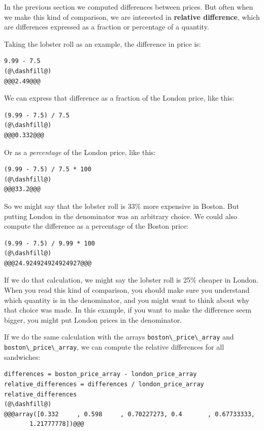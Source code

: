 In the previous section we computed differences between prices. But
often when we make this kind of comparison, we are interested in
\textbf{relative difference}, which are differences expressed as a
fraction or percentage of a quantity.

Taking the lobster roll as an example, the difference in price is:

\begin{lstlisting}[]
9.99 - 7.5
(@\dashfill@)
@@@2.49@@@
\end{lstlisting}

We can express that difference as a fraction of the London price, like
this:

\begin{lstlisting}[]
(9.99 - 7.5) / 7.5
(@\dashfill@)
@@@0.332@@@
\end{lstlisting}

Or as a \emph{percentage} of the London price, like this:

\begin{lstlisting}[]
(9.99 - 7.5) / 7.5 * 100
(@\dashfill@)
@@@33.2@@@
\end{lstlisting}

So we might say that the lobster roll is 33\% more expensive in Boston.
But putting London in the denominator was an arbitrary choice. We could
also compute the difference as a percentage of the Boston price:

\begin{lstlisting}[]
(9.99 - 7.5) / 9.99 * 100
(@\dashfill@)
@@@24.924924924924927@@@
\end{lstlisting}

If we do that calculation, we might say the lobster roll is 25\% cheaper
in London. When you read this kind of comparison, you should make sure
you understand which quantity is in the denominator, and you might want
to think about why that choice was made. In this example, if you want to
make the difference seem bigger, you might put London prices in the
denominator.

If we do the same calculation with the arrays
\passthrough{\lstinline!boston\_price\_array!} and
\passthrough{\lstinline!boston\_price\_array!}, we can compute the
relative differences for all sandwiches:

\begin{lstlisting}[]
differences = boston_price_array - london_price_array
relative_differences = differences / london_price_array
relative_differences
(@\dashfill@)
@@@array([0.332     , 0.598     , 0.70227273, 0.4       , 0.67733333,
       1.21777778])@@@
\end{lstlisting}

